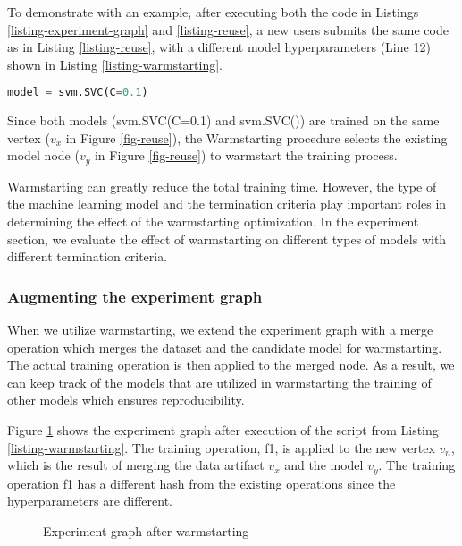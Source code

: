 To demonstrate with an example, after executing both the code in Listings \ref{listing-experiment-graph} and \ref{listing-reuse}, a new users submits the same code as in Listing \ref{listing-reuse}, with a different model hyperparameters (Line 12) shown in Listing \ref{listing-warmstarting}.
\begin{lstlisting}[language=Python, firstnumber=12, caption= Workload with different hyperparameters,captionpos=b,label = {listing-warmstarting}]
model = svm.SVC(C=0.1)
\end{lstlisting}
Since both models (svm.SVC(C=0.1) and svm.SVC()) are trained on the same vertex ($v_x$ in Figure \ref{fig-reuse}), the Warmstarting procedure selects the existing model node ($v_y$ in Figure \ref{fig-reuse}) to warmstart the training process.

Warmstarting can greatly reduce the total training time.
However, the type of the machine learning model and the termination criteria play important roles in determining the effect of the warmstarting optimization.
In the experiment section, we evaluate the effect of warmstarting on different types of models with different termination criteria.

\subsubsection{Augmenting the experiment graph}
When we utilize warmstarting, we extend the experiment graph with a merge operation which merges the dataset and the candidate model for warmstarting.
The actual training operation is then applied to the merged node.
As a result, we can keep track of the models that are utilized in warmstarting the training of other models which ensures reproducibility.

Figure \ref{fig-warmstarting} shows the experiment graph after execution of the script from Listing \ref{listing-warmstarting}.
The training operation, f1, is applied to the new vertex $v_n$, which is the result of merging the data artifact $v_x$ and the model $v_y$.
The training operation f1 has a different hash from the existing operations since the hyperparameters are different.

\begin{figure}[t]
\centering

\caption{Experiment graph after warmstarting}
\label{fig-warmstarting}
\end{figure}

